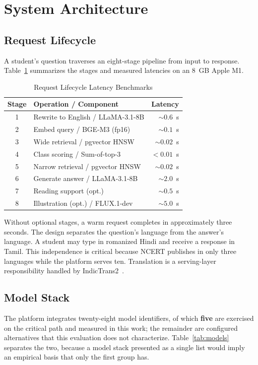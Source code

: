 \documentclass[conference]{IEEEtran}
\begin{document}
\section{System Architecture}

\subsection{Request Lifecycle}
A student's question traverses an eight-stage pipeline from input to response. Table~\ref{tab:lifecycle} summarizes the stages and measured latencies on an 8~GB Apple M1.

\begin{table}[htbp]
\caption{Request Lifecycle Latency Benchmarks}
\label{tab:lifecycle}
\centering
\begin{tabular}{@{}clr@{}}
\toprule
\textbf{Stage} & \textbf{Operation / Component} & \textbf{Latency} \\
\midrule
1 & Rewrite to English / LLaMA-3.1-8B & ${\sim}0.6$~s \\
2 & Embed query / BGE-M3 (fp16) & ${\sim}0.1$~s \\
3 & Wide retrieval / pgvector HNSW & ${\sim}0.02$~s \\
4 & Class scoring / Sum-of-top-3 & ${<}0.01$~s \\
5 & Narrow retrieval / pgvector HNSW & ${\sim}0.02$~s \\
6 & Generate answer / LLaMA-3.1-8B & ${\sim}2.0$~s \\
7 & Reading support (opt.) & ${\sim}0.5$~s \\
8 & Illustration (opt.) / FLUX.1-dev & ${\sim}5.0$~s \\
\bottomrule
\end{tabular}
\end{table}

Without optional stages, a warm request completes in approximately three seconds. The design separates the question's language from the answer's language. A student may type in romanized Hindi and receive a response in Tamil. This independence is critical because NCERT publishes in only three languages while the platform serves ten. Translation is a serving-layer responsibility handled by IndicTrans2~\cite{b7}.

\subsection{Model Stack}
\label{sec:models}
The platform integrates twenty-eight model identifiers, of which \textbf{five} are exercised on the critical path and measured in this work; the remainder are configured alternatives that this evaluation does not characterize. Table~\ref{tab:models} separates the two, because a model stack presented as a single list would imply an empirical basis that only the first group has.
\end{document}
